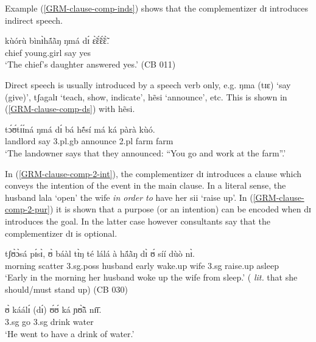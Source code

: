 Example (\ref{GRM-clause-comp-inds}) shows that the complementizer {\sls dɪ}
introduces indirect speech. 
\begin{exe}
 \ex\label{GRM-clause-comp-inds}
 \gll kùórù   bìnɪ̀hã́ã̀ŋ    ŋmá   dɪ́  ɛ̃̀ɛ̃́ɛ̃́ɛ̃̀.\\
 chief   young.girl   say   {\comp} yes\\
 \glt  `The chief's daughter answered yes.'  (CB 011) 
 \z


Direct speech is usually introduced by a speech
verb only, e.g. {\sls ŋma (tɪɛ)} `say (give)',   {\sls tʃagalɪ} `teach, show,
indicate', {\sls hẽsi} `announce', etc.  This is shown in 
(\ref{GRM-clause-comp-ds}) with {\sls hẽsi}.

\begin{exe}
 \ex\label{GRM-clause-comp-ds}
 \gll tɔ́ʊ́tɪ́ɪ́ná ŋmá dɪ́ bá hẽ́sí má ká pàrà kùó.\\
 landlord say  {\comp} {\sc 3.pl.g}b  announce {\sc 2.pl} {\egr} farm farm\\
 \glt  `The landowner says that they announced:  ``You go and work at the
farm''.' 
 \z

In (\ref{GRM-clause-comp-2-int}),  the complementizer {\sls dɪ} introduces a
clause which conveys the intention of the event in the main clause. In a literal
sense, the husband {\sls lala} `open'  the wife {\it in order to} have her 
{\sls 
sii} `raise up'. In (\ref{GRM-clause-comp-2-pur}) it is shown that a purpose (or
an intention) can be encoded when {\sls dɪ} introduces the goal. In the latter 
case however consultants say that the complementizer {\sls dɪ} is optional.



\ea\label{GRM-clause-comp-2}

 \ea\label{GRM-clause-comp-2-int}
\gll  tʃʊ̀ɔ̀sá   pɪ́sɪ̀, ʊ̀   báàl tɪ̀ŋ té lálá à hã́ã̀ŋ   
 dɪ̀  ʊ́   síí  dùò nɪ̀.\\
  morning scatter    {\sc 3.sg.poss}   husband  {\art} 
early  wake.up 
{\art}  wife   {\comp}   {\sc 3.sg}   raise.up asleep  
{\postp}\\
 \glt  `Early in the morning her husband woke up the wife from sleep.' ({\it
lit.} that she should/must stand up)  (CB 030)

 \ex\label{GRM-clause-comp-2-pur}
 \gll ʊ̀ káálɪ́ (dɪ́) ʊ́ʊ́ ká ɲʊ̃̀ã̀ nɪ̄ɪ̄.\\
{\sc 3.sg} go   {\comp}  {\sc 3.sg}   {\egr} drink  water\\
 \glt  `He went to have a drink of water.' 



\end{exe}
\end{exe}
